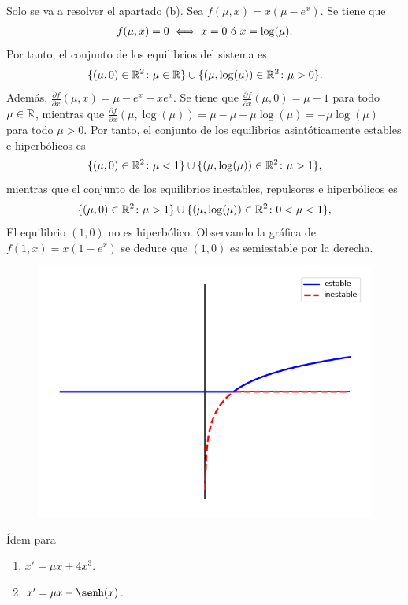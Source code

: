 \documentclass[11pt]{report}
\begin{document}
\begin{solution}
    Solo se va a resolver el apartado (b). Sea $f(\mu,x) = x(\mu-e^x)$. Se tiene que
    \begin{align*}
        f(\mu,x) = 0 \iff x = 0 \textup{ ó } x = \log(\mu).
    \end{align*}
    Por tanto, el conjunto de los equilibrios del sistema es
    \[\{(\mu,0) \in\mathbb R^2 \colon \mu \in \mathbb R\} \cup \{(\mu,\log(\mu)) \in\mathbb R^2 \colon \mu > 0\}.\]
    Además, $\frac{\partial f}{\partial x}(\mu,x) = \mu-e^x-xe^x$. Se tiene que $\frac{\partial f}{\partial x}(\mu,0) = \mu-1$ para todo $\mu\in\mathbb R$, mientras que $\frac{\partial f}{\partial x}(\mu,\log(\mu)) = \mu-\mu-\mu\log(\mu) = -\mu\log(\mu)$ para todo $\mu > 0$. Por tanto, el conjunto de los equilibrios asintóticamente estables e hiperbólicos es
    \[\{(\mu,0) \in\mathbb R^2 \colon \mu < 1\} \cup \{(\mu,\log(\mu)) \in\mathbb R^2 \colon \mu > 1\},\]
    mientras que el conjunto de los equilibrios inestables, repulsores e hiperbólicos es
    \[\{(\mu,0) \in\mathbb R^2 \colon \mu > 1\} \cup \{(\mu,\log(\mu)) \in\mathbb R^2 \colon 0 < \mu < 1\},\]
    El equilibrio $(1,0)$ no es hiperbólico. Observando la gráfica de $f(1,x) = x(1-e^x)$ se deduce que $(1,0)$ es semiestable por la derecha.
    \begin{figure}[H]
        \centering
        \includegraphics[scale=0.5]{img/8.png}
    \end{figure}
\end{solution}

\begin{exercise}
    Ídem para
    \begin{enumerate}
        \item $x' = \mu x +4x^3$.
        \item $x' = \mu x -\senh(x)$.
    \end{enumerate}
\end{exercise}
\end{document}
